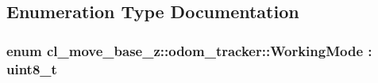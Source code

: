 \subsection{Enumeration Type Documentation}
\subsubsection[{\texorpdfstring{Working\+Mode}{WorkingMode}}]{\setlength{\rightskip}{0pt plus 5cm}enum {\bf cl\+\_\+move\+\_\+base\+\_\+z\+::odom\+\_\+tracker\+::\+Working\+Mode} \+: uint8\+\_\+t\hspace{0.3cm}{\ttfamily [strong]}}\hypertarget{namespacecl__move__base__z_1_1odom__tracker_ac46b05813b2791604f6cd0a39ace3ef8}{}\label{namespacecl__move__base__z_1_1odom__tracker_ac46b05813b2791604f6cd0a39ace3ef8}
